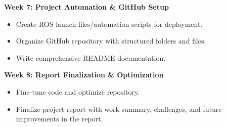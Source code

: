 \documentclass[12pt]{article}
\begin{document}
\textbf{Week 7: Project Automation \& GitHub Setup} \par
\begin{itemize}
    \item Create ROS launch files/automation scripts for deployment.
    \item Organize GitHub repository with structured folders and files.
    \item Write comprehensive README documentation.
\end{itemize}

\textbf{Week 8: Report Finalization \& Optimization} \par
\begin{itemize}
    \item Fine-tune code and optimize repository.
    \item Finalize project report with work summary, challenges, and future improvements in the report.
\end{itemize}
\end{document}

